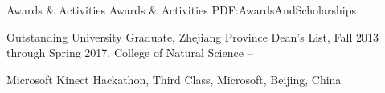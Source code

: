 \documentclass[letterpaper,MMMyyyy,nonstopmode]{simpleresumecv}
\begin{document}
\begin{Body}
    
    
    
    
    
    
    \Section
    {Awards \&\newline
    Activities}
    {Awards \& Activities }
    {PDF:AwardsAndScholarships}
    
    \BulletItem
    Outstanding University Graduate, Zhejiang Province
    \hfill
    \BulletItem
    Dean's List,
    Fall 2013 through Spring 2017,
    College of Natural Science
    \hfill
     --
    
    \Gap
    \BulletItem
    Microsoft Kinect Hackathon,
    Third Class, Microsoft, Beijing, China
    \hfill
    
    \end{Body}
    
\end{document}
